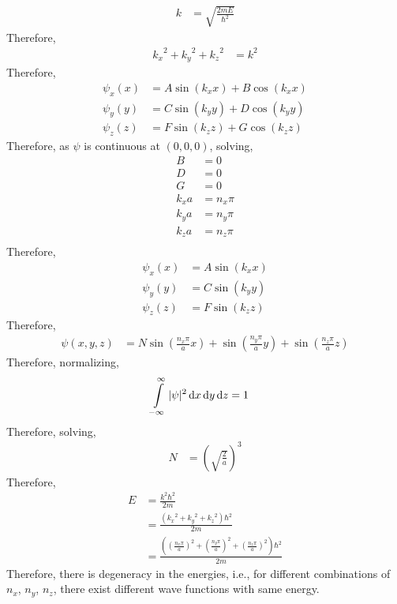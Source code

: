 \documentclass[titlepage, fleqn, a4paper, 12pt, twoside]{article}
\theoremstyle{definition}
\theoremstyle{theorem}
\begin{document}
\begin{solution}
\begin{align*}
		k &= \sqrt{\frac{2 m E}{\hbar^2}}
	\end{align*}
	Therefore,
	\begin{align*}
		{k_x}^2 + {k_y}^2 + {k_z}^2 &= k^2
	\end{align*}
	Therefore,
	\begin{align*}
		\psi_x(x) &= A \sin(k_x x) + B \cos(k_x x)\\
		\psi_y(y) &= C \sin(k_y y) + D \cos(k_y y)\\
		\psi_z(z) &= F \sin(k_z z) + G \cos(k_z z)
	\end{align*}
	Therefore, as $\psi$ is continuous at $(0,0,0)$, solving,
	\begin{align*}
		B &= 0\\
		D &= 0\\
		G &= 0\\
		k_x a &= n_x \pi\\
		k_y a &= n_y \pi\\
		k_z a &= n_z \pi\\
	\end{align*}
	Therefore,
	\begin{align*}
		\psi_x(x) &= A \sin(k_x x)\\
		\psi_y(y) &= C \sin(k_y y)\\
		\psi_z(z) &= F \sin(k_z z)
	\end{align*}
	Therefore,
	\begin{align*}
		\psi(x,y,z) &= N \sin\left( \frac{n_x \pi}{a} x \right) + \sin\left( \frac{n_y \pi}{a} y \right) + \sin\left( \frac{n_z \pi}{a} z \right)
	\end{align*}
	Therefore, normalizing,
	\begin{align*}
		\int\limits_{-\infty}^{\infty} |\psi|^2 \dif x \dif y \dif z &= 1
	\end{align*}
	Therefore, solving,
	\begin{align*}
		N &= \left( \sqrt{\frac{2}{a}} \right)^3
	\end{align*}
	Therefore,
	\begin{align*}
		E &= \frac{k^2 \hbar^2}{2 m}\\
		&= \frac{\left( {k_x}^2 + {k_y}^2 + {k_z}^2 \right) \hbar^2}{2 m}\\
		&= \frac{\left( \left( \frac{n_x \pi}{a} \right)^2 + \left( \frac{n_y \pi}{a} \right)^2 + \left( \frac{n_z \pi}{a} \right)^2 \right) \hbar^2}{2 m}
	\end{align*}
	Therefore, there is degeneracy in the energies, i.e., for different combinations of $n_x$, $n_y$, $n_z$, there exist different wave functions with same energy.
\end{solution}
\end{document}
